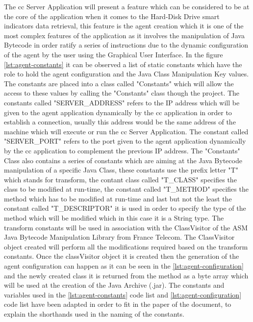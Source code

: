 The \acrfull{cc} Server Application will present a feature which can be considered to be at
the core of the application when it comes to the Hard-Disk Drive \acrfull{smart} indicators
data retrieval, this feature is the agent creation which it is one of the most complex
features of the application as it involves the manipulation of Java Bytecode in order
ratify a series of instructions due to the dynamic configuration of the agent by the
user using the Graphical User Interface. In the figure \ref{lst:agent-constants}
it can be observed a list of static constants which have the role to hold the agent
configuration and the Java Class Manipulation Key values. The constants are placed
into a class called "Constants" which will allow the access to these values by calling
the "Constants" class though the project. The constants called "SERVER\_ADDRESS" refers
to the IP address which will be given to the agent application dynamically by the \acrfull{cc}
application in order to establish a connection, usually this address would be the same
address of the machine which will execute or run the \acrfull{cc} Server Application.
The constant called "SERVER\_PORT" refers to the port given to the agent application
dynamically by the \acrfull{cc} application to complement the previous IP address.
The "Constants" Class also contains a series of constants which are aiming at the
Java Bytecode manipulation of a specific Java Class, these constants use the prefix letter
"T" which stands for transform, the contant class called "T\_CLASS" specifies the class
to be modified at run-time, the constant called "T\_METHOD" specifies the method which
has to be modified at run-time and last but not the least the constant called
"T\_DESCRIPTOR" it is used in order to specify the type of the method which will be
modified which in this case it is a String type. The transform constants will be used
in association with the ClassVisitor of the ASM Java Bytecode Manipulation Library from
France Telecom. The ClassVisitor object created will perform all the modifications required
based on the transform constants. Once the classVisitor object it is created then the
generation of the agent configuration can happen as it can be seen in
the \ref{lst:agent-configuration} and the newly created class it is
returned from the method as a byte array which will be used at
the creation of the Java Archive (.jar).
The constants and variables used in the \ref{lst:agent-constants} code list and
\ref{lst:agent-configuration} code list have been adapted in order to fit in the
paper of the document, to explain the shorthands used in the naming of the
constants.

